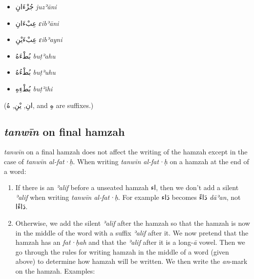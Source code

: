 \documentclass[
  10pt,
]{book}
\providecommand{\tightlist}{%
  \setlength{\itemsep}{0pt}\setlength{\parskip}{0pt}}
\begin{document}
\begin{itemize}
\tightlist
\item
  \foreignlanguage{arabic}{جُزْءَانِ} \emph{juzʾāni}\\
\item
  \foreignlanguage{arabic}{عِبْءَانِ} \emph{ɛibʾāni}\\
\item
  \foreignlanguage{arabic}{عِبْءَيْنِ} \emph{ɛibʾayni}\\
\item
  \foreignlanguage{arabic}{بُطْءَهُ} \emph{buṭʾahu}\\
\item
  \foreignlanguage{arabic}{بُطْءُهُ} \emph{buṭʾuhu}\\
\item
  \foreignlanguage{arabic}{بُطْءِهِ} \emph{buṭʾihi}
\end{itemize}

(\foreignlanguage{arabic}{انِ}, \foreignlanguage{arabic}{يْنِ}, \foreignlanguage{arabic}{هُ}, and \foreignlanguage{arabic}{هِ} are suffixes.)

\subsection{\texorpdfstring{\emph{tanwīn} on final hamzah}{tanwīn on final hamzah}}\label{tanwin-on-final-hamzah}

\emph{tanwīn} on a final hamzah does not affect the writing of the hamzah except in the case of \emph{tanwīn al-fat·ḥ}. When writing \emph{tanwīn al-fat·ḥ} on a hamzah at the end of a word:

\begin{enumerate}
\def\labelenumi{\arabic{enumi}.}
\item
  If there is an \emph{ʾalif} before a unseated hamzah \foreignlanguage{arabic}{اء}, then we don't add a silent \emph{ʾalif} when writing \emph{tanwīn al-fat·ḥ}. For example \foreignlanguage{arabic}{دَاء} becomes \foreignlanguage{arabic}{دَاءً} \emph{dāʾan}, not \foreignlanguage{arabic}{دَاءًا}.
\item
  Otherwise, we add the silent \emph{ʾalif} after the hamzah so that the hamzah is now in the middle of the word with a suffix \emph{ʾalif} after it. We now pretend that the hamzah has an \emph{fat·ḥah} and that the \emph{ʾalif} after it is a long-\emph{ā} vowel. Then we go through the rules for writing hamzah in the middle of a word (given above) to determine how hamzah will be written. We then write the \emph{an}-mark on the hamzah. Examples:
\end{enumerate}
\end{document}
